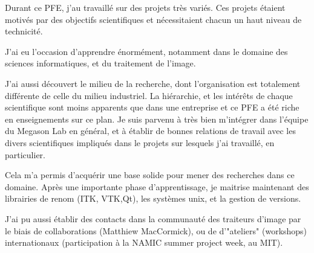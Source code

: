 Durant ce PFE, j'au travaillé sur des projets très variés.
Ces projets étaient motivés par des objectifs scientifiques et nécessitaient chacun un haut niveau de technicité.

J'ai eu l'occasion d'apprendre énormément,
notamment dans le domaine des sciences informatiques,
et du traitement de l'image.

J'ai aussi découvert le milieu de la recherche, dont l'organisation est
totalement différente de celle du milieu industriel.
La hiérarchie, et les intérêts de chaque scientifique sont moins apparents que dans une entreprise et ce PFE a été riche en enseignements sur ce plan.
Je suis parvenu à très bien m'intégrer dans l'équipe du Megason Lab en général,
et à établir de bonnes relations de travail avec les divers scientifiques
impliqués dans le projets sur lesquels j'ai travaillé, en particulier.

Cela m'a permis d'acquérir une base solide pour mener des recherches dans ce domaine.
Après une importante phase d'apprentissage, je maitrise maintenant des librairies de renom
(ITK, VTK,Qt), les systèmes unix, et la gestion de versions.

J'ai pu aussi établir des contacts dans la communauté
des traiteurs d'image par le biais de collaborations
(Matthiew MacCormick), ou de d'"ateliers" (workshops) internationaux
(participation à la NAMIC summer project week, au MIT).
